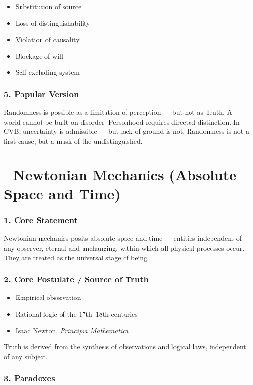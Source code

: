 \documentclass[12pt]{article}
\begin{document}
\begin{itemize}
\item Substitution of source
\item Loss of distinguishability
\item Violation of causality
\item Blockage of will
\item Self-excluding system
\end{itemize}

\subsubsection*{5. Popular Version}

Randomness is possible as a limitation of perception — but not as Truth. A world cannot be built on disorder. Personhood requires directed distinction. In CVB, uncertainty is admissible — but lack of ground is not. Randomness is not a first cause, but a mask of the undistinguished.

\section*{🔷 Newtonian Mechanics (Absolute Space and Time)}

\subsubsection*{1. Core Statement}

Newtonian mechanics posits absolute space and time — entities independent of any observer, eternal and unchanging, within which all physical processes occur. They are treated as the universal stage of being.

\subsubsection*{2. Core Postulate / Source of Truth}

\begin{itemize}
\item Empirical observation
\item Rational logic of the 17th–18th centuries
\item Isaac Newton, \textit{Principia Mathematica}
\end{itemize}

Truth is derived from the synthesis of observations and logical laws, independent of any subject.

\subsubsection*{3. Paradoxes}
\end{document}
